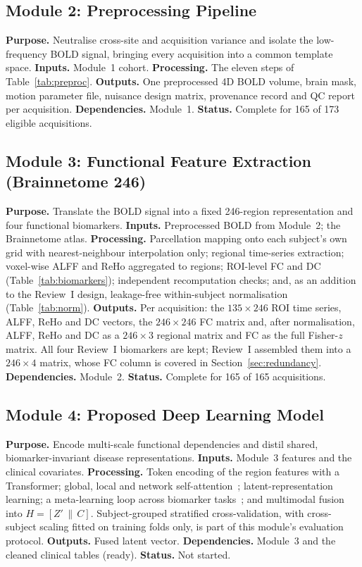 \documentclass{ssnreview}
\begin{document}
\subsection{Module 2: Preprocessing Pipeline}
\textbf{Purpose.} Neutralise cross-site and acquisition variance and isolate the
low-frequency BOLD signal, bringing every acquisition into a common template space.
\textbf{Inputs.} Module~1 cohort. \textbf{Processing.} The eleven steps of
Table~\ref{tab:preproc}. \textbf{Outputs.} One preprocessed 4D BOLD volume, brain mask,
motion parameter file, nuisance design matrix, provenance record and QC report per
acquisition. \textbf{Dependencies.} Module~1. \textbf{Status.} Complete for 165 of 173
eligible acquisitions.

\subsection{Module 3: Functional Feature Extraction (Brainnetome 246)}
\textbf{Purpose.} Translate the BOLD signal into a fixed 246-region representation and
four functional biomarkers. \textbf{Inputs.} Preprocessed BOLD from Module~2; the
Brainnetome atlas. \textbf{Processing.} Parcellation mapping onto each subject's own
grid with nearest-neighbour interpolation only; regional time-series extraction;
voxel-wise ALFF and ReHo aggregated to regions; ROI-level FC and DC
(Table~\ref{tab:biomarkers}); independent recomputation checks; and, as an addition to
the Review~I design, leakage-free within-subject normalisation
(Table~\ref{tab:norm}). \textbf{Outputs.} Per acquisition: the $135\times246$ ROI time
series, ALFF, ReHo and DC vectors, the $246\times246$ FC matrix and, after
normalisation, ALFF, ReHo and DC as a $246\times3$ regional matrix and FC as the
full Fisher-$z$ matrix. All four Review~I biomarkers are kept; Review~I assembled them
into a $246\times4$ matrix, whose FC column is covered in Section~\ref{sec:redundancy}.
\textbf{Dependencies.} Module~2. \textbf{Status.} Complete for 165 of 165 acquisitions.

\subsection{Module 4: Proposed Deep Learning Model}
\textbf{Purpose.} Encode multi-scale functional dependencies and distil shared,
biomarker-invariant disease representations. \textbf{Inputs.} Module~3 features and the
clinical covariates. \textbf{Processing.} Token encoding of the region features with a
Transformer; global, local and network self-attention~\cite{vaswani2017};
latent-representation learning; a meta-learning loop across biomarker
tasks~\cite{finn2017}; and multimodal fusion into $H=[Z'\,\|\,C]$. Subject-grouped
stratified cross-validation, with cross-subject scaling fitted on training folds only,
is part of this module's evaluation protocol. \textbf{Outputs.} Fused latent vector.
\textbf{Dependencies.} Module~3 and the cleaned clinical tables (ready). \textbf{Status.} Not
started.
\end{document}

